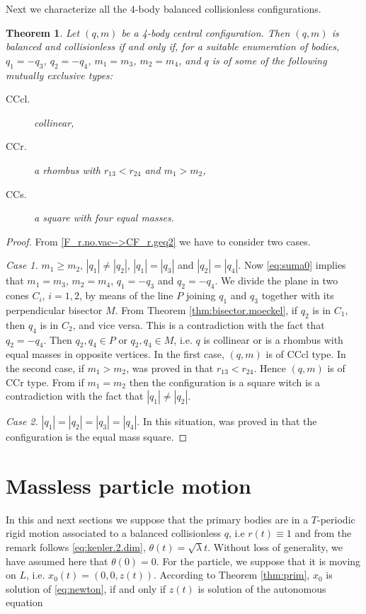 \documentclass[twoside]{article}
\newtheorem{thm}{Theorem}[section]
\theoremstyle{remark}
\begin{document}
Next we characterize all the $4$-body balanced collisionless configurations.

\begin{thm}\label{thm:caracterizacion4}
Let $(q,m)$ be a 4-body central configuration. Then $(q,m)$ is  balanced and collisionless if and only if,  for a suitable enumeration  of bodies,   $q_1=-q_3$, $q_2=-q_4$, $m_1=m_3$,  $m_2=m_4$, and  $q$ is of some of the following mutually exclusive types:
\begin{description}
\item[CCcl.]   collinear,
\item[CCr.]  a rhombus with $r_{13}<r_{24}$ and $m_1>m_2$,
\item[CCs.]  a square with four equal masses.
\end{description}
\end{thm}







\begin{proof}
From \eqref{F_r.no.vac-->CF_r.geq2} we have to consider two cases.

\emph{Case 1.}  $m_1\geq m_2$, $|q_1|\neq|q_2|$, $|q_1|=|q_3|$ and $|q_2|=|q_4|$. Now \eqref{eq:suma0} implies that
 $m_1=m_3$, $m_2=m_4$, $q_1=-q_3$ and $q_2=-q_4$.  We divide the plane in two cones $C_i$, $i=1,2$, by means of  the line $P$ joining $q_1$  and $q_3$ together with its perpendicular bisector $M$.  From Theorem \ref{thm:bisector.moeckel}, if  $q_2$  is in $C_1$, then  $q_4$ is in $C_2$, and vice versa. This is a contradiction with the fact that $q_2=-q_4$. Then $q_2,q_4\in P$ or $q_2,q_4\in M$, i.e. $q$ is collinear or is a rhombus with equal masses in opposite vertices. In the first case, $(q,m)$ is of  CCcl type. In the second case, if $m_1>m_2$,   was proved in \cite[Eqs. $(3.44)$ and $(3.45)$]{long2002four} that $r_{13}<r_{24}$. Hence $(q,m)$ is of  CCr type. From \cite[Corollary 2]{perez2007convex} if $m_1=m_2$ then the configuration is a square witch is a contradiction with the fact that $|q_1|\neq|q_2|$.

\emph{Case 2.} $|q_1|=|q_2|=|q_3|=|q_4|$. In this situation,  was proved in \cite{hampton2005co} that the configuration is the equal mass square.
\end{proof}

\section{Massless particle motion}\label{sec:mas-mot}
In this and next sections we suppose that the primary bodies are in a $T$-periodic rigid motion associated to a balanced collisionless $q$, i.e  $r(t)\equiv 1$ and from the remark follows \eqref{eq:kepler.2.dim}, $\theta (t)=\sqrt{\lambda}t$. Without loss of generality,  we have assumed here that $\theta(0)=0$. For the particle, we suppose that it is moving on $L$, i.e. $x_0(t)=(0,0,z(t))$. According to Theorem \ref{thm:prim}, $x_0$ is solution of \eqref{eq:newton}, if and only if $z(t)$ is solution of the autonomous equation
\end{document}
